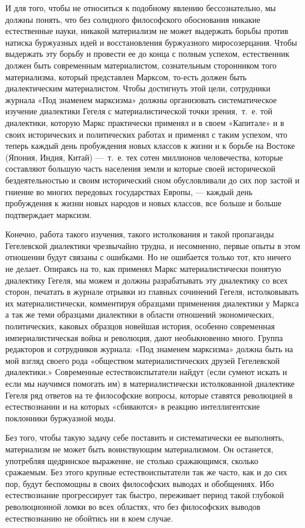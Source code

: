 И для того, чтобы не относиться к подобному явлению бессознательно, мы
должны понять, что без солидного философского обоснования никакие
естественные науки, никакой материализм не может выдержать борьбы против
натиска буржуазных идей и восстановления буржуазного миросозерцания. Чтобы
выдержать эту борьбу и провести ее до конца с полным успехом, естественник
должен быть современным материалистом, сознательным сторонником того
материализма, который представлен Марксом, то-есть должен быть
диалектическим материалистом. Чтобы достигнуть этой цели, сотрудники
журнала «Под знаменем марксизма» должны организовать систематическое
изучение диалектики Гегеля с материалистической точки зрения,~т.~е. той
диалектики, которую Маркс практически применял и в своем «Капитале» и в
своих исторических и политических работах и применял с таким успехом, что
теперь каждый день пробуждения новых классов к жизни и к борьбе на Востоке
(Япония, Индия, Китай) —~т.~е. тех сотен миллионов человечества, которые
составляют большую часть населения земли и которые своей исторической
бездеятельностью и своим исторический сном обусловливали до сих пор застой
и гниение во многих передовых государствах Европы, — каждый день
пробуждения к жизни новых народов и новых классов, все больше и больше
подтверждает марксизм.

Конечно, работа такого изучения, такого истолкования и такой пропаганды
Гегелевской диалектики чрезвычайно трудна, и несомненно, первые опыты в
этом отношении будут связаны с ошибками. Но не ошибается только тот, кто
ничего не делает. Опираясь на то, как применял Маркс материалистически
понятую диалектику Гегеля, мы можем и должны разрабатывать эту диалектику
со всех сторон, печатать в журнале отрывки из главных сочинений Гегеля,
истолковывать их материалистически, комментируя образцами применения
диалектики у Маркса а так же теми образцами диалектики в области отношений
экономических, политических, каковых образцов новейшая история, особенно
современная империалистическая война и революция, дают необыкновенно много.
Группа редакторов и сотрудников журнала: «Под знаменем марксизма» должна
быть на мой взгляд своего рода «обществом материалистических друзей
Гегелевской диалектики.» Современные естествоиспытатели найдут (если сумеют
искать и если мы научимся помогать им) в материалистически истолкованной
диалектике Гегеля ряд ответов на те философские вопросы, которые ставятся
революцией в естествознании и на которых «сбиваются» в реакцию
интеллигентские поклонники буржуазной моды.

Без того, чтобы такую задачу себе поставить и систематически ее выполнять,
материализм не может быть воинствующим материализмом. Он останется,
употребляя щедринское выражение, не столько сражающимся, сколько сражаемым.
Без этого крупные естествоиспытатели так же часто, как и до сих пор, будут
беспомощны в своих философских выводах и обобщениях. Ибо естествознание
прогрессирует так быстро, переживает период такой глубокой революционной
ломки во всех областях, что без философских выводов естествознанию не
обойтись ни в коем случае.

